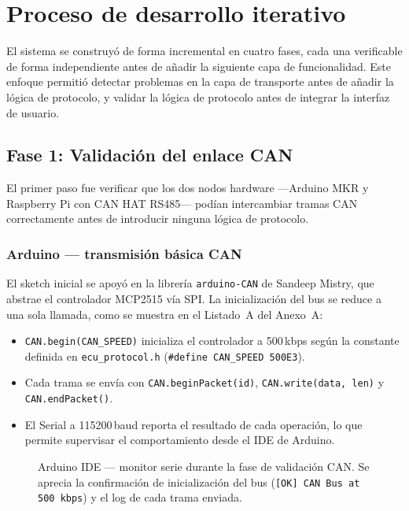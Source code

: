 \section{Proceso de desarrollo iterativo}
\label{sec:desarrollo_iterativo}

El sistema se construyó de forma incremental en cuatro fases, cada una verificable de forma independiente antes de añadir la siguiente capa de funcionalidad. Este enfoque permitió detectar problemas en la capa de transporte antes de añadir la lógica de protocolo, y validar la lógica de protocolo antes de integrar la interfaz de usuario.

\subsection{Fase 1: Validación del enlace CAN}
\label{sec:fase1}

El primer paso fue verificar que los dos nodos hardware —Arduino MKR y Raspberry Pi con CAN HAT RS485— podían intercambiar tramas CAN correctamente antes de introducir ninguna lógica de protocolo.

\subsubsection*{Arduino — transmisión básica CAN}

El sketch inicial se apoyó en la librería \texttt{arduino-CAN} de Sandeep Mistry, que abstrae el controlador MCP2515 vía SPI. La inicialización del bus se reduce a una sola llamada, como se muestra en el Listado~A del Anexo~A:

\begin{itemize}
    \item \texttt{CAN.begin(CAN\_SPEED)} inicializa el controlador a 500\,kbps según la constante definida en \texttt{ecu\_protocol.h} (\texttt{\#define CAN\_SPEED 500E3}).
    \item Cada trama se envía con \texttt{CAN.beginPacket(id)}, \texttt{CAN.write(data, len)} y \texttt{CAN.endPacket()}.
    \item El Serial a 115200\,baud reporta el resultado de cada operación, lo que permite supervisar el comportamiento desde el IDE de Arduino.
\end{itemize}

\begin{figure}[!htbp]
\centering
\caption{Arduino IDE — monitor serie durante la fase de validación CAN. Se aprecia la confirmación de inicialización del bus (\texttt{[OK] CAN Bus at 500 kbps}) y el log de cada trama enviada.}
\label{fig:fase1_arduino_serial}
\end{figure}

